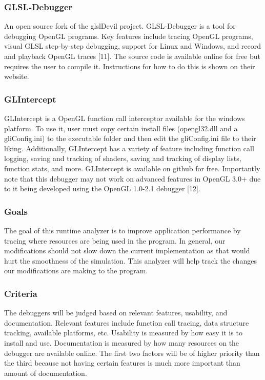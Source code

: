\documentclass[10pt,journal,compsoc,draftclsnofoot]{IEEEtran}
\begin{document}
\subsubsection{GLSL-Debugger}
An open source fork of the glslDevil project.
GLSL-Debugger is a tool for debugging OpenGL programs.
Key features include tracing OpenGL programs, visual GLSL step-by-step debugging, support for Linux and Windows, and record and playback OpenGL traces [11].
The source code is available online for free but requires the user to compile it.
Instructions for how to do this is shown on their website.

\subsubsection{GLIntercept}
GLIntercept is a OpenGL function call interceptor available for the windows platform. \cite{glsl}
To use it, user must copy certain install files (opengl32.dll and a gliConfig.ini) to the executable folder and then edit the gliConfig.ini file to their liking.
Additionally, GLIntercept has a variety of feature including function call logging, saving and tracking of shaders, saving and tracking of display lists, function stats, and more.
GLIntercept is available on github for free.
Importantly note that this debugger may not work on advanced features in OpenGL 3.0+ due to it being developed using the OpenGL 1.0-2.1 debugger [12].

\subsubsection{Goals}
The goal of this runtime analyzer is to improve application performance by tracing where resources are being used in the program.
In general, our modifications should not slow down the current implementation as that would hurt the smoothness of the simulation.
This analyzer will help track the changes our modifications are making to the program.

\subsubsection{Criteria}
The debuggers will be judged based on relevant features, usability, and documentation.
Relevant features include function call tracing, data structure tracking, available platforms, etc.
Usability is measured by how easy it is to install and use.
Documentation is measured by how many resources on the debugger are available online.
The first two factors will be of higher priority than the third because not having certain features is much more important than amount of documentation.
\end{document}
